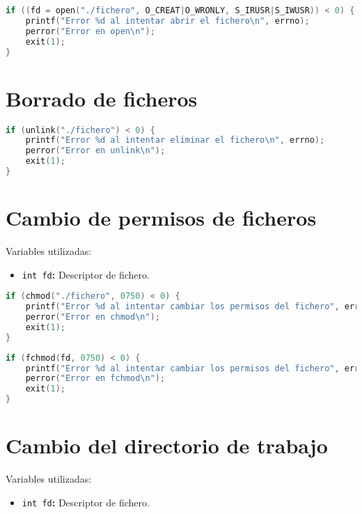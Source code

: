 \begin{lstlisting}[language=C]
if ((fd = open("./fichero", O_CREAT|O_WRONLY, S_IRUSR|S_IWUSR)) < 0) {
	printf("Error %d al intentar abrir el fichero\n", errno);
	perror("Error en open\n");
	exit(1);
}
\end{lstlisting}

\pagebreak

\section{Borrado de ficheros}

\begin{lstlisting}[language=C]
if (unlink("./fichero") < 0) {
	printf("Error %d al intentar eliminar el fichero\n", errno);
	perror("Error en unlink\n");
	exit(1);
}
\end{lstlisting}

\section{Cambio de permisos de ficheros}

Variables utilizadas:

\begin{itemize}
	\item\texttt{int fd}\textbf{:} Descriptor de fichero.
\end{itemize}

\begin{lstlisting}[language=C]
if (chmod("./fichero", 0750) < 0) {
	printf("Error %d al intentar cambiar los permisos del fichero", errno);
	perror("Error en chmod\n");
	exit(1);
}
\end{lstlisting}

\begin{lstlisting}[language=C]
if (fchmod(fd, 0750) < 0) {
	printf("Error %d al intentar cambiar los permisos del fichero", errno);
	perror("Error en fchmod\n");
	exit(1);
}
\end{lstlisting}

\section{Cambio del directorio de trabajo}

Variables utilizadas:

\begin{itemize}
	\item\texttt{int fd}\textbf{:} Descriptor de fichero.
\end{itemize}


